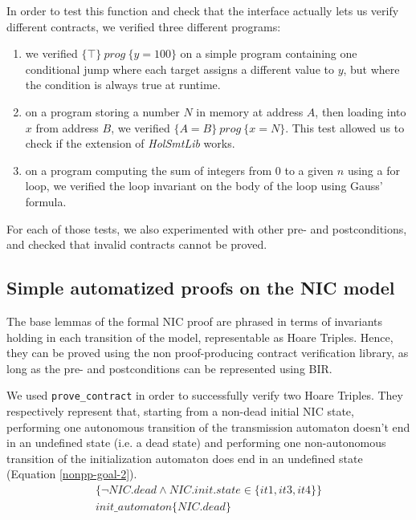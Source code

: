 \documentclass[10pt,a4paper]{article}
\newcommand{\htriple}[3]{\ensuremath{\{#1\}~#2~\{#3\}}}
\begin{document}
\begin{multicols}{2}
In order to test this function and check that the interface actually lets us verify different contracts, we verified three different programs:

\begin{enumerate}
  \item we verified \htriple{\top}{prog}{y = 100} on a simple program containing one conditional jump where each target assigns a different value to $y$, but where the condition is always true at runtime.
  \item on a program storing a number $N$ in memory at address $A$, then loading into $x$ from address $B$, we verified \htriple{A=B}{prog}{x=N}. This test allowed us to check if the extension of \textit{HolSmtLib} works.
  \item on a program computing the sum of integers from $0$ to a given $n$ using a for loop, we verified the loop invariant on the body of the loop using Gauss' formula.
\end{enumerate}

For each of those tests, we also experimented with other pre- and postconditions, and checked that invalid contracts cannot be proved.

\subsection{Simple automatized proofs on the NIC model} \label{simple-automated-proofs-on-nic}

The base lemmas of the formal NIC proof are phrased in terms of invariants holding in each transition of the model, representable as Hoare Triples. Hence, they can be proved using the non proof-producing contract verification library, as long as the pre- and postconditions can be represented using BIR.

We used \texttt{prove\_contract} in order to successfully verify two Hoare Triples. They respectively represent that, starting from a non-dead initial NIC state, performing one autonomous transition of the transmission automaton doesn't end in an undefined state (i.e. a dead state) and performing one non-autonomous transition of the initialization automaton does end in an undefined state (Equation \ref{nonpp-goal-2}).
%
\begin{multline}
	\{\neg NIC.dead \land NIC.init.state \in \{it1,it3,it4\}\}\\
	init\_automaton\{NIC.dead\}
    \label{nonpp-goal-2}
\end{multline}


\end{multicols}
\end{document}

